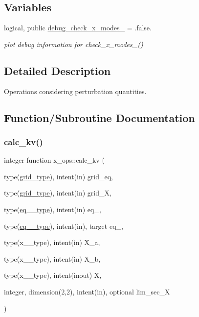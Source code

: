 \subsection*{Variables}
\begin{DoxyCompactItemize}
\item 
logical, public \hyperlink{namespacex__ops_a342c624ea5f9a15264c78767da34684c}{debug\+\_\+check\+\_\+x\+\_\+modes\+\_} = .false.
\begin{DoxyCompactList}\small\item\em plot debug information for check\+\_\+x\+\_\+modes\+\_() \end{DoxyCompactList}\end{DoxyCompactItemize}


\subsection{Detailed Description}
Operations considering perturbation quantities. 

\subsection{Function/\+Subroutine Documentation}
\mbox{\label{namespacex__ops_a045e8903230dfa0fb8b89b458d0c8ee2}} 
\subsubsection{\texorpdfstring{calc\+\_\+kv()}{calc\_kv()}}
{\footnotesize\ttfamily integer function x\+\_\+ops\+::calc\+\_\+kv (\begin{DoxyParamCaption}\item[{type(\hyperlink{structgrid__vars_1_1grid__type}{grid\+\_\+type}), intent(in)}]{grid\+\_\+eq,  }\item[{type(\hyperlink{structgrid__vars_1_1grid__type}{grid\+\_\+type}), intent(in)}]{grid\+\_\+X,  }\item[{type(\hyperlink{structeq__vars_1_1eq__1__type}{eq\+\_\+1\+\_\+type}), intent(in)}]{eq\+\_,  }\item[{type(\hyperlink{structeq__vars_1_1eq__2__type}{eq\+\_\+2\+\_\+type}), intent(in), target}]{eq\+\_,  }\item[{type(x\+\_\+1\+\_\+type), intent(in)}]{X\+\_\+a,  }\item[{type(x\+\_\+1\+\_\+type), intent(in)}]{X\+\_\+b,  }\item[{type(x\+\_\+2\+\_\+type), intent(inout)}]{X,  }\item[{integer, dimension(2,2), intent(in), optional}]{lim\+\_\+sec\+\_\+X }\end{DoxyParamCaption})}



